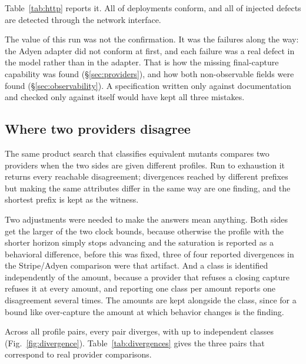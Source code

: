 \documentclass[conference]{IEEEtran}
\begin{document}
Table~\ref{tab:http} reports it. All \httpconforming{} of \httpdeployments{}
deployments conform, and all \httpinjecteddetected{} of \httpinjected{} injected
defects are detected through the network interface.

The value of this run was not the confirmation. It was the failures along the
way: the Adyen adapter did not conform at first, and each failure was a real
defect in the model rather than in the adapter. That is how the missing
final-capture capability was found (\S\ref{sec:providers}), and how both
non-observable fields were found (\S\ref{sec:observability}). A specification
written only against documentation and checked only against itself would have
kept all three mistakes.

\begin{table}[t]
\centering
\caption{The same suite over HTTP, against services speaking each provider's
request shape.}
\label{tab:http}
\scriptsize

\end{table}

\subsection{Where two providers disagree}
\label{sec:divergence}

The same product search that classifies equivalent mutants compares two
providers when the two sides are given different profiles. Run to exhaustion it
returns every reachable disagreement; divergences reached by different prefixes
but making the same attributes differ in the same way are one finding, and the
shortest prefix is kept as the witness.

Two adjustments were needed to make the answers mean anything. Both sides get
the larger of the two clock bounds, because otherwise the profile with the
shorter horizon simply stops advancing and the saturation is reported as a
behavioral difference, before this was fixed, three of four reported
divergences in the Stripe/Adyen comparison were that artifact. And a class is
identified independently of the amount, because a provider that refuses a closing
capture refuses it at every amount, and reporting one class per amount reports
one disagreement several times. The amounts are kept alongside the class, since
for a bound like over-capture the amount at which behavior changes is the
finding.

Across all \numpairs{} profile pairs, every pair diverges, with up to
\maxdivergences{} independent classes (Fig.~\ref{fig:divergence}).
Table~\ref{tab:divergences} gives the three pairs that correspond to real
provider comparisons.
\end{document}
